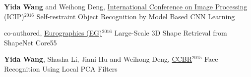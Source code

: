 \begin{cventries}
\begin{enumerate}[label={[\arabic*]}, leftmargin=*]

\item 
\cvpublication
{\textbf{Yida Wang} and Weihong Deng, \underline{International Conference on Image Processing (ICIP)}$^{2016}$} %
{Self-restraint Object Recognition by Model Based CNN Learning} %
{} %
{} %


\item 
\cvpublication
{co-authored, \underline{Eurographics (EG)}$^{2016}$} %
{Large-Scale 3D Shape Retrieval from ShapeNet Core55} %
{} %
{} %


\item 
\cvpublication
{\textbf{Yida Wang}, Shasha Li, Jiani Hu and Weihong Deng, \underline{CCBR}$^{2015}$} %
{Face Recognition Using Local PCA Filters} %
{} %
{} %
\end{enumerate}


\end{cventries}

